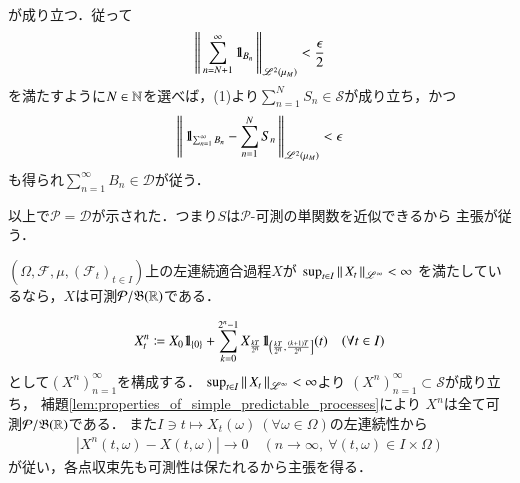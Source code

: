 \begin{prf}
\begin{description}
\begin{itemize}
\begin{align}
						\end{align}
						が成り立つ．従って
						\begin{align}
							\left\|\, \sum_{n=N+1}^{\infty}\mbox{1}\hspace{-0.25em}\mbox{l}_{B_n}\, \right\|_{\mathscr{L}^{2} \left(\mu_M\right)} < \frac{\epsilon}{2}
						\end{align}
						を満たすように$N \in \mathbb{N}$を選べば，(1)より$\sum_{n=1}^{N}S_n \in \mathcal{S}$が成り立ち，かつ
						\begin{align}
							\left\|\, \mbox{1}\hspace{-0.25em}\mbox{l}_{\sum_{n=1}^{\infty}B_n} - \sum_{n=1}^{N}S_n\, \right\|_{\mathscr{L}^{2} \left(\mu_M\right)} < \epsilon
						\end{align}
						も得られ$\sum_{n=1}^{\infty} B_n \in \mathcal{D}$が従う．
				\end{itemize}
				以上で$\mathcal{P} = \mathcal{D}$が示された．つまり$S$は$\mathcal{P}$-可測の単関数を近似できるから
				主張が従う．
				\QED
		\end{description}
	\end{prf}
	
	\begin{screen}
		\begin{thm}
			$(\Omega,\mathcal{F},\mu,(\mathcal{F}_t)_{t \in I})$上の左連続適合過程$X$が
			$\operatorname*{sup}_{t \in I} \left\|\, X_t\, \right\|_{\mathscr{L}^\infty} < \infty$
			を満たしているなら，$X$は可測$\mathcal{P}/\mathfrak{B}(\mathbb{R})$である．
			\label{thm:left_continuous_adapted_then_predictable}
		\end{thm}
	\end{screen}
	
	\begin{prf}
		\begin{align}
			X^n_t \coloneqq X_0 \mbox{1}\hspace{-0.25em}\mbox{l}_{\{0\}} + \sum_{k=0}^{2^n-1} X_{\frac{kT}{2^n}} \mbox{1}\hspace{-0.25em}\mbox{l}_{\left( \frac{kT}{2^n}, \frac{(k+1)T}{2^n}\right]}(t)
			\quad (\forall t \in I)
			\label{eq:thm_left_continuous_adapted_then_predictable}
		\end{align}
		として$\left( X^n \right)_{n=1}^{\infty}$を構成する．
		$\operatorname*{sup}_{t \in I} \left\|\, X_t\, \right\|_{\mathscr{L}^\infty} < \infty$より
		$\left( X^n \right)_{n=1}^{\infty} \subset \mathcal{S}$が成り立ち，
		補題\ref{lem:properties_of_simple_predictable_processes}により
		$X^n$は全て可測$\mathcal{P}/\mathfrak{B}(\mathbb{R})$である．
		また$I \ni t \longmapsto X_t(\omega)\ (\forall \omega \in \Omega)$の左連続性から
		\begin{align}
			\left| X^n(t,\omega) - X(t,\omega) \right| \longrightarrow 0
			\quad (n \longrightarrow \infty,\ \forall (t,\omega) \in I \times \Omega)
		\end{align}
		が従い，各点収束先も可測性は保たれるから主張を得る．
		\QED
	\end{prf}
	